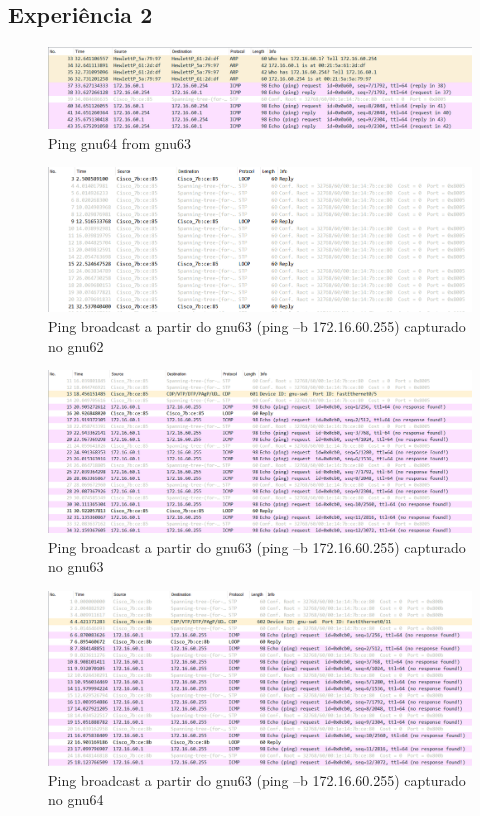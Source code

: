 \documentclass[article, a4paper, 11pt, oneside]{memoir}
\begin{document}
\newpage
\subsection{Experiência 2}
\begin{figure}[h]
	\centering
\includegraphics[scale=0.55]{exp2-step5-ping-gnu64-from-gnu63.png}
\caption{Ping gnu64 from gnu63}
\end{figure}

\begin{figure}[h]
	\centering
\includegraphics[scale=0.55]{exp2-step8-broadcast-gnu63-from-gnu62.png}
\caption{Ping broadcast a partir do gnu63 (ping –b 172.16.60.255) capturado no gnu62}
\end{figure}

\begin{figure}[h]
	\centering
\includegraphics[scale=0.55]{exp2-step8-broadcast-gnu63-from-gnu63.png}
\caption{Ping broadcast a partir do gnu63 (ping –b 172.16.60.255) capturado no gnu63}
\end{figure}

\newpage
\begin{figure}[h]
	\centering
\includegraphics[scale=0.55]{exp2-step8-broadcast-gnu63-from-gnu64.png}
\caption{Ping broadcast a partir do gnu63 (ping –b 172.16.60.255) capturado no gnu64}
\end{figure}
\end{document}
